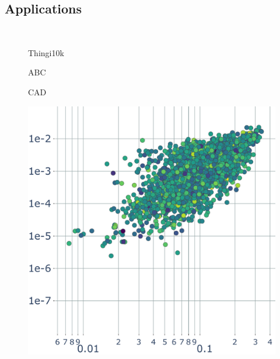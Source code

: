 \subsection{Applications}\label{cumin:sec:application}


\begin{figure}
    \centering
    \parbox{0.01\linewidth}{~}\hfill\hfill
    \parbox{.3\linewidth}{\centering Thingi10k}\hfill
    \parbox{.3\linewidth}{\centering ABC}\hfill
    \parbox{.3\linewidth}{\centering CAD}\par
    \parbox{0.01\linewidth}{\centering{}}\hfill\hfill
    \parbox{.3\linewidth}{\includegraphics[width=\linewidth]{curve_meshing_in_shell_tex/figs/stats/error_Thingi10k}}\hfill

\end{figure}
